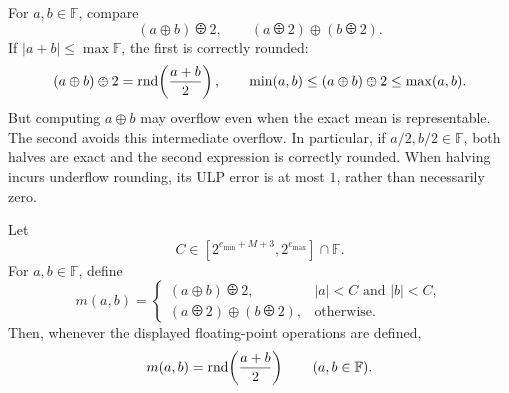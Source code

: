 \begin{example}
For $a, b\in\mathbb F$, compare
\[
 (a\oplus b)\odiv2,
 \qquad(a\odiv2)\oplus(b\odiv2).
\]
If $|a+b|\le\max\mathbb F$, the first is correctly rounded:
\[
 (a\oplus b)\odiv2
 =\rnd\!\left(\frac{a+b}{2}\right), \qquad
 \min(a, b)\le(a\oplus b)\odiv2\le\max(a, b).
\]
But computing $a\oplus b$ may overflow even when the exact
mean is representable. The second avoids this intermediate
overflow. In particular, if $a/2, b/2\in\mathbb F$, both halves
are exact and the second expression is correctly rounded.
When halving incurs underflow rounding, its ULP error is at
most $1$, rather than necessarily zero.
\end{example}

\begin{theorem}
Let
\[
 C\in[2^{e_{\min}+M+3}, 2^{e_{\max}}]\cap\mathbb F.
\]
For $a, b\in\mathbb F$, define
\[
 m(a, b)=
 \begin{cases}
 (a\oplus b)\odiv2, &|a|<C\text{ and }|b|<C, \\
 (a\odiv2)\oplus(b\odiv2), &\text{otherwise}.
 \end{cases}
\]
Then, whenever the displayed floating-point operations are defined,
\[
 m(a, b)=\operatorname{rnd}\!\left(\frac{a+b}{2}\right)
 \qquad(a, b\in\mathbb F).
\]
\end{theorem}
